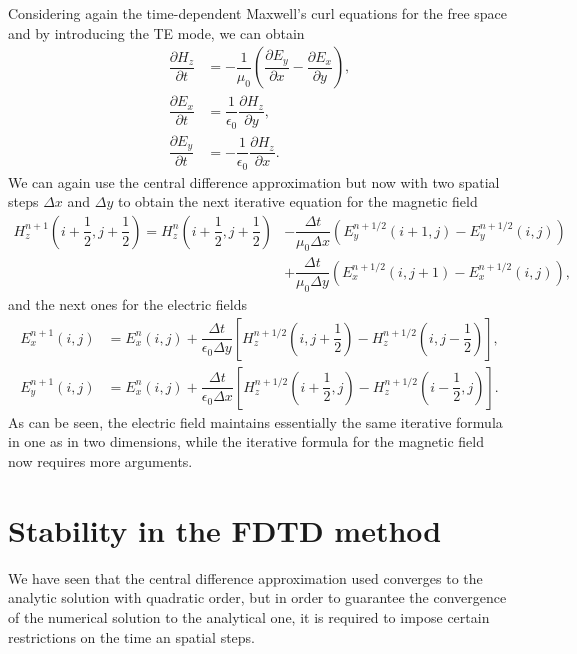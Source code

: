 \documentclass[12pt, oneside]{book}
\begin{document}
\indent Considering again the time-dependent Maxwell's curl equations for the free space and by introducing the TE mode, we can obtain
\begin{align}
    \dfrac{\partial H_z}{\partial t} &= -\dfrac{1}{\mu_0} \left( \dfrac{\partial E_y}{\partial x} - \dfrac{\partial E_x}{\partial y} \right), \\
    \dfrac{\partial E_x}{\partial t} &= \dfrac{1}{\epsilon_0} \dfrac{\partial H_z}{\partial y}, \\
    \dfrac{\partial E_y}{\partial t} &= -\dfrac{1}{\epsilon_0} \dfrac{\partial H_z}{\partial x}. 
\end{align}
We can again use the central difference approximation but now with two spatial steps $\Delta x$ and $\Delta y$ to obtain the next iterative equation for the magnetic field
\begin{equation}
\begin{aligned}
    H_z^{n + 1}\left( i + \dfrac{1}{2},j + \dfrac{1}{2} \right) = H_z^{n}\left( i + \dfrac{1}{2},j + \dfrac{1}{2} \right) &- \dfrac{\Delta t}{\mu_0 \Delta x}\left( E_y^{n + 1/2}(i+1,j) - E_y^{n + 1/2}(i,j) \right) \\
                                                                                                                          &+ \dfrac{\Delta t}{\mu_0 \Delta y}\left( E_x^{n + 1/2}(i,j+1) - E_x^{n + 1/2}(i,j) \right),
\end{aligned}
\label{eq:FDTDMagneticField2D}
\end{equation}
and the next ones for the electric fields
\begin{align}
    E_x^{n+1}(i, j) &= E_x^{n}(i, j) + \dfrac{\Delta t}{\epsilon_0 \Delta y}\left[ H_z^{n+1/2}\left( i,j + \dfrac{1}{2} \right) - H_z^{n+1/2}\left( i,j - \dfrac{1}{2} \right) \right], \\
    E_y^{n+1}(i, j) &= E_x^{n}(i, j) + \dfrac{\Delta t}{\epsilon_0 \Delta x}\left[ H_z^{n+1/2}\left( i + \dfrac{1}{2},j \right) - H_z^{n+1/2}\left( i - \dfrac{1}{2},j \right) \right].
\end{align}
As can be seen, the electric field maintains essentially the same iterative formula in one as in two dimensions, while the iterative formula for the magnetic field now requires more arguments.

\section{Stability in the FDTD method}

We have seen that the central difference approximation used converges to the analytic solution with quadratic order, but in order to guarantee the convergence of the numerical solution to the analytical one, it is required to impose certain restrictions on the time an spatial steps.
\end{document}
